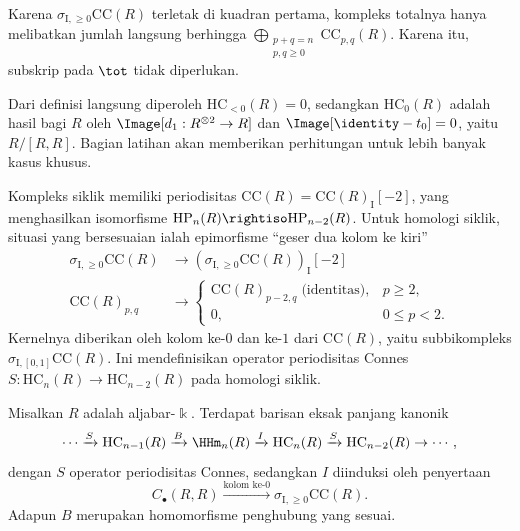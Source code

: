 Karena $\sigma_{\mathrm{I},\geq0}\mathrm{CC}(R)$ terletak di kuadran pertama,
kompleks totalnya hanya melibatkan jumlah langsung berhingga
$\bigoplus_{\substack{p+q=n\\p,q\geq0}}\mathrm{CC}_{p,q}(R)$. Karena itu,
subskrip pada $\tot$ tidak diperlukan.

Dari definisi langsung diperoleh $\mathrm{HC}_{<0}(R)=0$, sedangkan
$\mathrm{HC}_0(R)$ adalah hasil bagi $R$ oleh
$\Image[d_1:R^{\otimes2}\to R]$ dan
$\Image[\identity-t_0]=0$, yaitu $R/[R,R]$. Bagian latihan akan memberikan
perhitungan untuk lebih banyak kasus khusus.

Kompleks siklik memiliki periodisitas
$\mathrm{CC}(R)=\mathrm{CC}(R)_{\mathrm{I}}[-2]$, yang menghasilkan
isomorfisme $\mathrm{HP}_n(R)\rightiso\mathrm{HP}_{n-2}(R)$. Untuk homologi
siklik, situasi yang bersesuaian ialah epimorfisme ``geser dua kolom ke kiri''
\begin{align*}
	\sigma_{\mathrm{I},\geq0}\mathrm{CC}(R)
	&\to\left(\sigma_{\mathrm{I},\geq0}\mathrm{CC}(R)\right)_{\mathrm{I}}[-2]\\
	\mathrm{CC}(R)_{p,q}
	&\to\begin{cases}
		\mathrm{CC}(R)_{p-2,q}\;\text{(identitas)},&p\geq2,\\
		0,&0\leq p<2.
	\end{cases}
\end{align*}
Kernelnya diberikan oleh kolom ke-$0$ dan ke-$1$ dari $\mathrm{CC}(R)$,
yaitu subbikompleks $\sigma_{\mathrm{I},[0,1]}\mathrm{CC}(R)$. Ini
mendefinisikan operator periodisitas Connes
$S:\mathrm{HC}_n(R)\to\mathrm{HC}_{n-2}(R)$ pada homologi siklik.

\begin{teorema}[A.\ Connes]\label{prop:Connes-exact}
	Misalkan $R$ adalah aljabar-$\Bbbk$. Terdapat barisan eksak panjang
	kanonik
	\[ \cdots \xrightarrow{S} \mathrm{HC}_{n-1}(R)
		\xrightarrow{B} \HHm_n(R) \xrightarrow{I} \mathrm{HC}_n(R)
		\xrightarrow{S} \mathrm{HC}_{n-2}(R) \to \cdots, \]
	dengan $S$ operator periodisitas Connes, sedangkan $I$ diinduksi oleh
	penyertaan
	\[
		C_\bullet(R,R)\xrightarrow{\text{kolom ke-$0$}}
		\sigma_{\mathrm{I},\geq0}\mathrm{CC}(R).
	\]
	Adapun $B$ merupakan homomorfisme penghubung yang sesuai.
\end{teorema}

